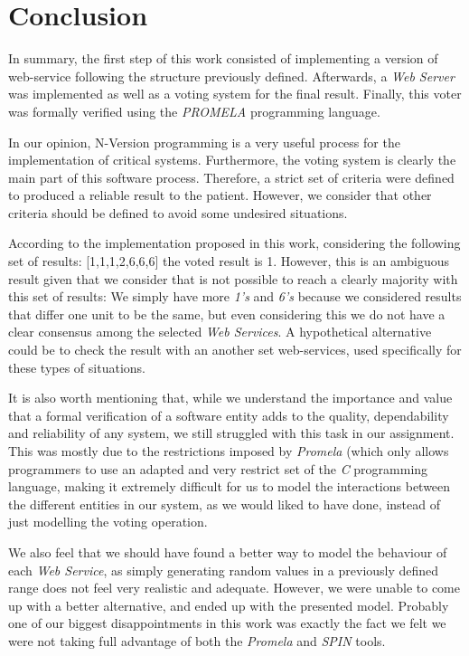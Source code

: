 \chapter{Conclusion}
\label{conclusion}

    In summary, the first step of this work consisted of implementing a version of web-service following the structure previously defined. Afterwards, a \emph{Web Server} was implemented as well as a voting system for the final result. Finally, this voter was formally verified using the \emph{PROMELA} programming language.
    
    In our opinion, N-Version programming is a very useful process for the implementation of critical systems. Furthermore, the voting system is clearly the main part of this software process. Therefore, a strict set of criteria were defined to produced a reliable result to the patient. However, we consider that other criteria should be defined to avoid some undesired situations.
    
    According to the implementation proposed in this work, considering the following set of results: [1,1,1,2,6,6,6] the voted result is 1. However, this is an ambiguous result given that we consider that is not possible to reach a clearly majority with this set of results: We simply have more \emph{1's} and \emph{6's} because we considered results that differ one unit to be the same, but even considering this we do not have a clear consensus among the selected \emph{Web Services}. A hypothetical alternative could be to check the result with an another set web-services, used specifically for these types of situations.
    
    It is also worth mentioning that, while we understand the importance and value that a formal verification of a software entity adds to the quality, dependability and reliability of any system, we still struggled with this task in our assignment. This was mostly due to the restrictions imposed by \emph{Promela} (which only allows programmers to use an adapted and very restrict set of the \emph{C} programming language, making it extremely difficult for us to model the interactions between the different entities in our system, as we would liked to have done, instead of just modelling the voting operation.
    
    We also feel that we should have found a better way to model the behaviour of each \emph{Web Service}, as simply generating random values in a previously defined range does not feel very realistic and adequate. However, we were unable to come up with a better alternative, and ended up with the presented model. Probably one of our biggest disappointments in this work was exactly the fact we felt we were not taking full advantage of both the \emph{Promela} and \emph{SPIN} tools.
    
